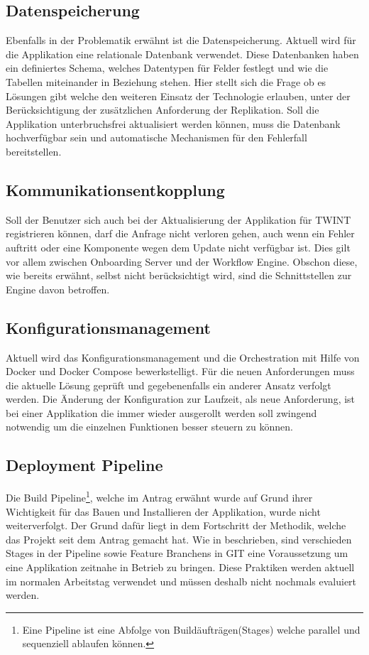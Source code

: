 \subsection{Datenspeicherung}

Ebenfalls in der Problematik erwähnt ist die Datenspeicherung. Aktuell wird für die Applikation eine relationale Datenbank verwendet. Diese Datenbanken haben ein definiertes Schema, welches Datentypen für Felder festlegt und wie die Tabellen miteinander in Beziehung stehen. Hier stellt sich die Frage ob es Lösungen gibt welche den weiteren Einsatz der Technologie erlauben, unter der Berücksichtigung der zusätzlichen Anforderung der Replikation. Soll die Applikation unterbruchsfrei aktualisiert werden können, muss die Datenbank hochverfügbar sein und automatische Mechanismen für den Fehlerfall bereitstellen.

\subsection{Kommunikationsentkopplung}

Soll der Benutzer sich auch bei der Aktualisierung der Applikation für TWINT registrieren können, darf die Anfrage nicht verloren gehen, auch wenn ein Fehler auftritt oder eine Komponente wegen dem Update nicht verfügbar ist. Dies gilt vor allem zwischen Onboarding Server und der Workflow Engine. Obschon diese, wie bereits erwähnt, selbst nicht berücksichtigt wird, sind die Schnittstellen zur Engine davon betroffen.

\subsection{Konfigurationsmanagement}

Aktuell wird das Konfigurationsmanagement {\color{red} und die Orchestration} mit Hilfe von Docker und Docker Compose bewerkstelligt. Für die neuen Anforderungen muss die aktuelle Lösung geprüft und gegebenenfalls ein anderer Ansatz verfolgt werden. Die Änderung der Konfiguration zur Laufzeit, als neue Anforderung, ist bei einer Applikation die immer wieder ausgerollt werden soll zwingend notwendig um die einzelnen Funktionen besser steuern zu können.

\subsection{Deployment Pipeline}

Die Build Pipeline\footnote{Eine Pipeline ist eine Abfolge von Buildäufträgen(Stages) welche parallel und sequenziell ablaufen können. }, welche im Antrag erwähnt wurde auf Grund ihrer Wichtigkeit für das Bauen und Installieren der Applikation, wurde nicht weiterverfolgt. Der Grund dafür liegt in dem Fortschritt der Methodik, welche das Projekt seit dem Antrag gemacht hat. Wie in \cite{atlassiancd} beschrieben, sind verschieden Stages in der Pipeline sowie Feature Branchens in GIT eine Voraussetzung um eine Applikation zeitnahe in Betrieb zu bringen. Diese Praktiken werden aktuell im normalen Arbeitstag verwendet und müssen deshalb nicht nochmals evaluiert werden.

